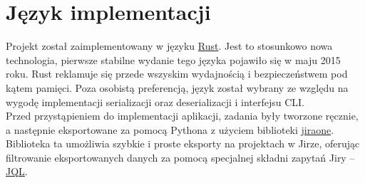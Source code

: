 \section{Język implementacji}
Projekt został zaimplementowany w języku \href{https://www.rust-lang.org/}{Rust}.
Jest to stosunkowo nowa technologia, pierwsze stabilne wydanie tego języka pojawiło się w maju 2015 roku.
Rust reklamuje się przede wszyskim wydajnością i bezpieczeństwem pod kątem pamięci.
Poza osobistą preferencją, język został wybrany ze względu na wygodę implementacji serializacji oraz deserializacji i interfejsu CLI. \\

Przed przystąpieniem do implementacji aplikacji, zadania były tworzone ręcznie, a następnie eksportowane za pomocą Pythona z użyciem biblioteki \href{https://pypi.org/project/jiraone/}{jiraone}.
Biblioteka ta umożliwia szybkie i proste eksporty na projektach w Jirze, oferując filtrowanie eksportowanych danych za pomocą specjalnej składni zapytań Jiry -- \href{https://www.atlassian.com/blog/jira-software/jql-the-most-flexible-way-to-search-jira-14}{JQL}.
